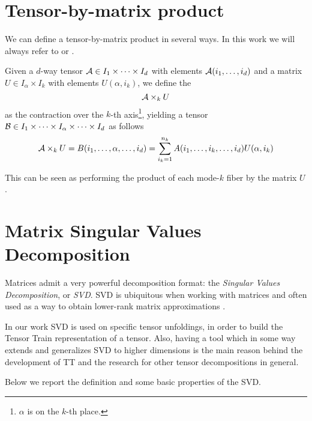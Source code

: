 \section{Tensor-by-matrix product}
We can define a tensor-by-matrix product in several ways. In this work we will always refer to  or .

\begin{Def} \label{def:tensor-matrix-product}
  Given a $d$-way tensor $\mathcal{A} \in I_1 \times \cdots \times I_d$ with elements $\mathcal{A}(i_1,\ldots,i_d)$ and a matrix $U \in I_\alpha \times I_k$ with elements $U(\alpha,i_k)$, we define the 
  \begin{equation*}
    \mathcal{A} \times_k U
  \end{equation*}
  as the contraction over the $k$-th axis\footnote{$\alpha$ is on the $k$-th place.}, yielding a tensor $\mathcal{B} \in I_1 \times \cdots \times I_\alpha \times \cdots \times I_d$ as follows
  \begin{equation*}
    \mathcal{A} \times_k U = B(i_1,\ldots,\alpha,\ldots,i_d) = \sum_{i_k = 1}^{n_k} A(i_1,\ldots,i_k,\ldots,i_d) U(\alpha,i_k)
  \end{equation*}
\end{Def}
This can be seen as performing the product of each mode-$k$ fiber by the matrix $U$.

\section{Matrix Singular Values Decomposition}
Matrices admit a very powerful decomposition format: the \emph{Singular Values Decomposition}, or \emph{SVD}. SVD is ubiquitous when working with matrices and often used as a way to obtain lower-rank matrix approximations \cite{SVDbestapprox}.

In our work SVD is used on specific tensor unfoldings, in order to build the Tensor Train representation of a tensor. Also, having a tool which in some way extends and generalizes SVD to higher dimensions is the main reason behind the development of TT and the research for other tensor decompositions in general.

Below we report the definition and some basic properties of the SVD.

